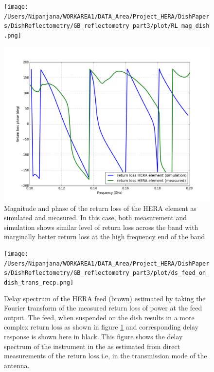 \documentclass[twocolumn]{emulateapj}
\begin{document}
\begin{figure}[ht]
\begin{minipage}[b]{\linewidth}
\centering
\texttt{[image: /Users/Nipanjana/WORKAREA1/DATA\_Area/Project\_HERA/DishPapers/DishReflectometry/GB\_reflectometry\_part3/plot/RL\_mag\_dish.png]}
\end{minipage}
\vspace{0.1cm}
\begin{minipage}[b]{\linewidth}
\centering
\includegraphics[angle=0, width=\linewidth]{plots/HERA_meas_sim_ph.png}
\end{minipage}
\caption{Magnitude and phase of the return loss of the HERA element as simulated and measured. In this case, both measurement and simulation shows similar level of return loss across the band with marginally better return loss at the high frequency end of the band. }   
\label{RL_mag_dish}
\end{figure}

\begin{figure}       
\centering
\texttt{[image: /Users/Nipanjana/WORKAREA1/DATA\_Area/Project\_HERA/DishPapers/DishReflectometry/GB\_reflectometry\_part3/plot/ds\_feed\_on\_dish\_trans\_recp.png]}
\caption{Delay spectrum of the HERA feed (brown) estimated by taking the Fourier transform of the measured return loss of power at the feed output. The feed, when suspended on the dish results in a more complex return loss as shown in figure \ref{RL_mag_dish} and corresponding delay response is shown here in black. This figure shows the delay spectrum of the instrument in the as estimated from direct measurements of the return loss i.e, in the transmission mode of the antenna. }
\label{ds_feed_on_dish_trans}
\end{figure}
\end{document}
